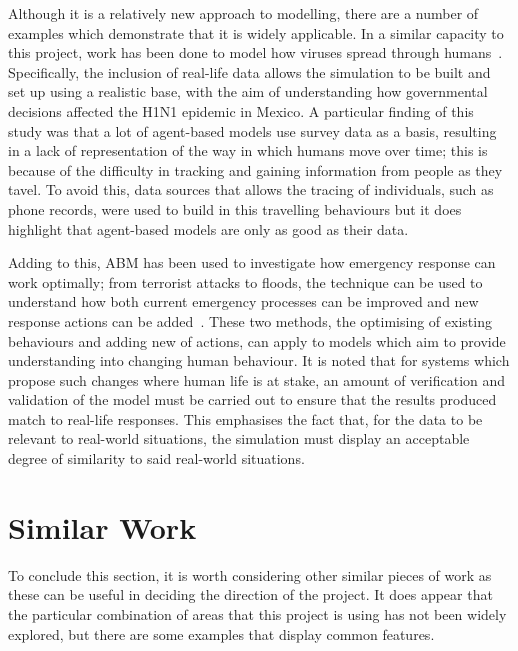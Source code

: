 \documentclass[]{report}
\begin{document}
Although it is a relatively new approach to modelling, there are a number of examples which demonstrate that it is widely applicable. In a similar capacity to this project, work has been done to model how viruses spread through humans~\cite{ABM-IEEE}. Specifically, the inclusion of real-life data allows the simulation to be built and set up using a realistic base, with the aim of understanding how governmental decisions affected the H1N1 epidemic in Mexico. A particular finding of this study was that a lot of agent-based models use survey data as a basis, resulting in a lack of representation of the way in which humans move over time; this is because of the difficulty in tracking and gaining information from people as they tavel. To avoid this, data sources that allows the tracing of individuals, such as phone records, were used to build in this travelling behaviours but it does highlight that agent-based models are only as good as their data.

Adding to this, ABM has been used to investigate how emergency response can work optimally; from terrorist attacks to floods, the technique can be used to understand how both current emergency processes can be improved and new response actions can be added~\cite{emergency}. These two methods, the optimising of existing behaviours and adding new of actions, can apply to models which aim to provide understanding into changing human behaviour. It is noted that for systems which propose such changes where human life is at stake, an amount of verification and validation of the model must be carried out to ensure that the results produced match to real-life responses. This emphasises the fact that, for the data to be relevant to real-world situations, the simulation must display an acceptable degree of similarity to said real-world situations.

\section{Similar Work}

To conclude this section, it is worth considering other similar pieces of work as these can be useful in deciding the direction of the project. It does appear that the particular combination of areas that this project is using has not been widely explored, but there are some examples that display common features.
\end{document}
